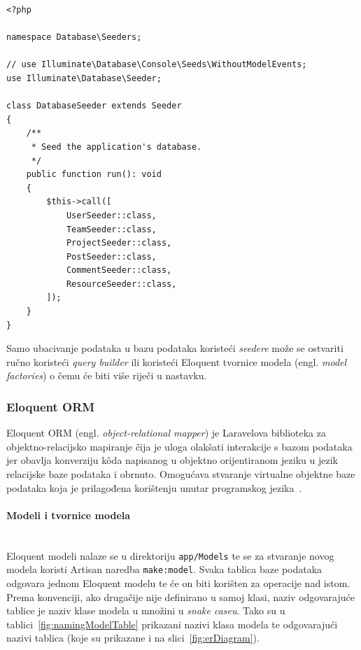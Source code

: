 \begin{lstlisting}[caption={Sadržaj \texttt{DatabaseSeeder} klase}, label=databaseSeeder]
<?php

namespace Database\Seeders;

// use Illuminate\Database\Console\Seeds\WithoutModelEvents;
use Illuminate\Database\Seeder;

class DatabaseSeeder extends Seeder
{
    /**
     * Seed the application's database.
     */
    public function run(): void
    {
        $this->call([
            UserSeeder::class,
            TeamSeeder::class,
            ProjectSeeder::class,
            PostSeeder::class,
            CommentSeeder::class,
            ResourceSeeder::class,
        ]);
    }
}

\end{lstlisting}

Samo ubacivanje podataka u bazu podataka koristeći \textit{seedere} može se ostvariti ručno koristeći \textit{query builder} ili koristeći Eloquent tvornice modela (engl. \textit{model factories}) o čemu će biti više riječi u nastavku.

\subsubsection{Eloquent ORM}
Eloquent ORM (engl. \textit{object-relational mapper}) je Laravelova biblioteka za objektno-relacijsko mapiranje čija je uloga olakšati interakcije s bazom podataka jer obavlja konverziju k\^oda napisanog u objektno orijentiranom jeziku u jezik relacijske baze podataka i obrnuto. Omogućava stvaranje virtualne objektne baze podataka koja je prilagođena korištenju unutar programskog jezika~\cite{eloquent}.

\paragraph{Modeli i tvornice modela}\mbox{}\\
\indent Eloquent modeli nalaze se u direktoriju \texttt{app/Models} te se za stvaranje novog modela koristi Artisan naredba \texttt{make:model}. Svaka tablica baze podataka odgovara jednom Eloquent modelu te će on biti korišten za operacije nad istom. Prema konvenciji, ako drugačije nije definirano u samoj klasi, naziv odgovarajuće tablice je naziv klase modela u množini u \textit{snake caseu}. Tako su u tablici~\ref{fig:namingModelTable} prikazani nazivi klasa modela te odgovarajući nazivi tablica (koje su prikazane i na slici~\ref{fig:erDiagram}).

